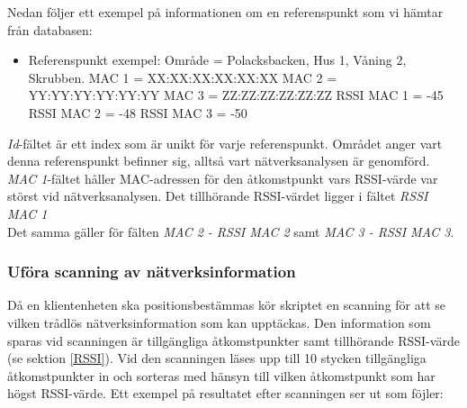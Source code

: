 \documentclass[swedish, a4paper,12pt]{article}
\begin{document}
Nedan följer ett exempel på informationen om en referenspunkt som vi hämtar från databasen:
\begin{itemize}
  \item Referenspunkt exempel:
        \newline Område = Polacksbacken, Hus 1, Våning 2, Skrubben.
        \newline MAC 1 = XX:XX:XX:XX:XX:XX
        \newline MAC 2 = YY:YY:YY:YY:YY:YY
        \newline MAC 3 = ZZ:ZZ:ZZ:ZZ:ZZ:ZZ
        \newline RSSI MAC 1 = -45
        \newline RSSI MAC 2 = -48
        \newline RSSI MAC 3 = -50
\end{itemize}

\textit{Id}-fältet är ett index som är unikt för varje referenspunkt. %
Området anger vart denna referenspunkt befinner sig, alltså vart nätverksanalysen är genomförd. \\
\textit{MAC 1}-fältet håller MAC-adressen för den åtkomstpunkt vars RSSI-värde var störst vid nätverksanalysen. Det tillhörande RSSI-värdet ligger i fältet \textit{RSSI MAC 1}\\
Det samma gäller för fälten \textit{MAC 2 - RSSI MAC 2} samt \textit{MAC 3 - RSSI MAC 3}.

\subsubsection{Uföra scanning av nätverksinformation} \label{scanning}
Då en klientenheten ska positionsbestämmas kör skriptet en scanning för att se vilken trådlös nätverksinformation som kan upptäckas. Den information som sparas vid scanningen är tillgängliga åtkomstpunkter samt tillhörande RSSI-värde (se sektion \ref{RSSI}). Vid den scanningen läses upp till 10 stycken tillgängliga åtkomstpunkter %
in och sorteras med hänsyn till vilken åtkomstpunkt som har högst RSSI-värde. Ett exempel på resultatet efter scanningen ser ut som föjler:
\end{document}
